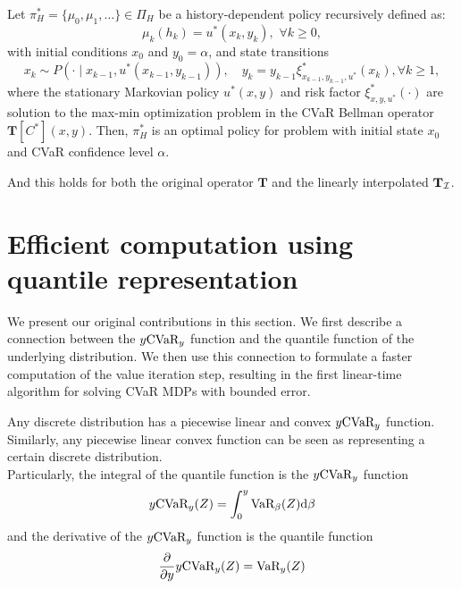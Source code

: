 \begin{theorem}\label{thm:optimalpolicy}
Let $\pi_H^*=\{\mu_0,\mu_1,\ldots\}\in\Pi_H$ be a history-dependent policy recursively defined as:
\begin{equation}\label{eqn:policy_construct}
\mu_k(h_k) = u^*(x_k, y_k),\,\,\forall k\geq 0,
\end{equation}
with initial conditions $x_0$ and $y_0=\alpha$, and state transitions
\begin{equation}\label{eqn:opt_state}
x_k\sim P(\cdot\mid x_{k-1},u^*(x_{k-1},y_{k-1})),\quad y_k = y_{k-1}\xi_{x_{k-1},y_{k-1},u^*}^*(x_k), \forall k\geq 1,
\end{equation}
where the stationary Markovian policy $u^*(x,y)$ and risk factor $\xi_{x,y,u^*}^*(\cdot)$ are solution to the  max-min optimization problem in the CVaR Bellman operator $\mathbf T[C^*](x,y)$.
Then, $\pi^*_H$ is an optimal policy for problem  with initial state $x_0$ and CVaR confidence level $\alpha$.
\end{theorem}

And this holds for both the original operator $\mathbf{T}$ and the linearly interpolated $\mathbf{T}_{\mathcal{I}}$.


\section{Efficient computation using quantile representation}\label{sec:vi:linear}

We present our original contributions in this section. We first describe a connection between the $y\text{CVaR}_y$ function and the quantile function of the underlying distribution. We then use this connection to formulate a faster computation of the value iteration step, resulting in the first linear-time algorithm for solving CVaR MDPs with bounded error.

\begin{lemma}\label{thm:varcvarconnection}
Any discrete distribution has a piecewise linear and convex $y\text{CVaR}_y$ function. Similarly, any piecewise linear convex function can be seen as representing a certain discrete distribution.
\\
Particularly, the integral of the quantile function is the $y\text{CVaR}_y$ function
\begin{equation}\label{eqn:varcvarintegration}
y\text{CVaR}_y(Z) = \int_0^y \text{VaR}_\beta(Z) \text{d} \beta
\end{equation}
and the derivative of the $y\text{CVaR}_y$ function is the quantile function
\begin{equation}\label{eqn:varcvarderivation}
\dfrac{\partial}{\partial y} y \text{CVaR}_y(Z) = \text{VaR}_y(Z)
\end{equation}
\end{lemma}

